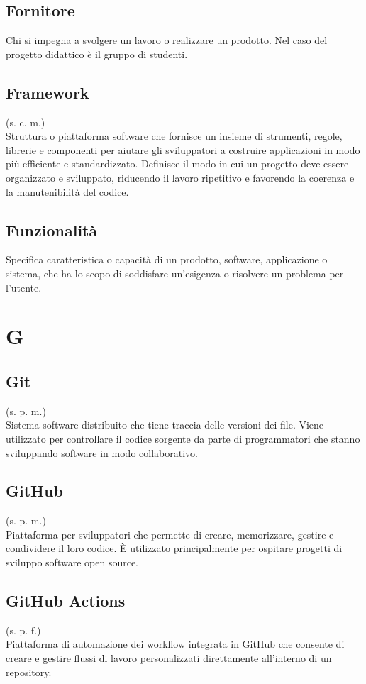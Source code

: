     \subsection{Fornitore}
    Chi si impegna a svolgere un lavoro o realizzare un prodotto. Nel caso del progetto didattico
    è il gruppo di studenti.
    \subsection{Framework}
    (s. c. m.)\\
    Struttura o piattaforma software che fornisce un insieme di strumenti, regole, 
    librerie e componenti per aiutare gli sviluppatori a costruire applicazioni 
    in modo più efficiente e standardizzato. Definisce il modo in cui un progetto 
    deve essere organizzato e sviluppato, riducendo il lavoro ripetitivo e favorendo 
    la coerenza e la manutenibilità del codice.
    \subsection{Funzionalità}
    \label{Funzionalità}
    Specifica caratteristica o capacità di un prodotto, software, applicazione o sistema, 
    che ha lo scopo di soddisfare un'esigenza o risolvere un problema per l'utente.
\pagebreak
\section{G}
    \subsection{Git}
    \label{Git}
    (s. p. m.)\\
    Sistema software distribuito che tiene traccia delle versioni dei file. 
    Viene utilizzato per controllare il codice sorgente da parte di programmatori 
    che stanno sviluppando software in modo collaborativo.
    \subsection{GitHub}
    \label{GitHub}
    (s. p. m.)\\
    Piattaforma per sviluppatori che permette di creare, memorizzare, gestire 
    e condividere il loro codice. È utilizzato principalmente per ospitare 
    progetti di sviluppo software open source.
    \subsection{GitHub Actions}
    \label{GitHub Actions}
    (s. p. f.)\\
    Piattaforma di automazione dei workflow integrata in GitHub che consente 
    di creare e gestire flussi di lavoro personalizzati direttamente all'interno 
    di un repository.
